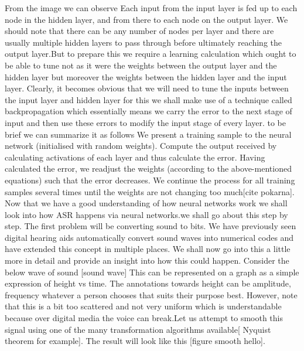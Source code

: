 \documentclass[sigconf]{acmart}
\begin{document}
From the image we can observe Each input from the input layer is fed up to each node in the hidden layer, and from there to each node on the output layer. We should note that there can be any number of nodes per layer and there are usually multiple hidden layers to pass through before ultimately reaching the output layer.But to prepare this we require a learning calculation which ought to be able to tune not as it were the weights between the output layer and the hidden layer but moreover the weights between the hidden layer and the input layer. Clearly, it becomes obvious that we will need to tune the inputs between the input layer and hidden layer for this we shall make use of a technique called backpropagation which essentially means we carry the error to the next stage of input and then use these errors to modify the input stage of every layer. to be brief we can summarize it as follows We present a training sample to the neural network (initialised with random weights). Compute the output received by calculating activations of each layer and thus calculate the error. Having calculated the error, we readjust the weights (according to the above-mentioned equations) such that the error decreases. We continue the process for all training samples several times until the weights are not changing too much[cite pokarna]. 
\newline
Now that we have a good understanding of how neural networks work we shall look into how ASR happens via neural networks.we shall go about this step by step. The first problem will be converting sound to bits. We have previously seen digital hearing aids automatically convert sound waves into numerical codes and have extended this concept in multiple places. We shall now go into this a little more in detail and provide an insight into how this could happen. Consider the below wave of sound [sound wave] 
This can be represented on a graph as a simple expression of height vs time. The annotations towards height can be amplitude, frequency whatever a person chooses that suits their purpose best. However, note that this is a bit too scattered and not very uniform which is understandable because over digital media the voice can break.Let us attempt to smooth this signal using one of the many transformation algorithms available[ Nyquist theorem for example]. The result will look like this [figure smooth hello].
\end{document}

